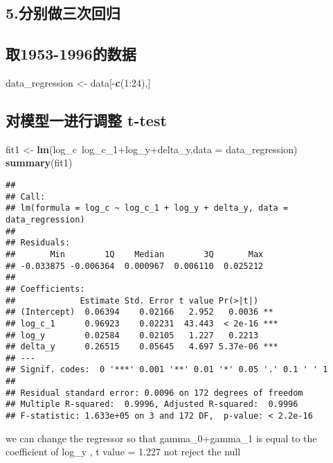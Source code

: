 \documentclass[]{article}
\newenvironment{Shaded}{\begin{snugshade}}{\end{snugshade}}
\newcommand{\KeywordTok}[1]{\textcolor[rgb]{0.13,0.29,0.53}{\textbf{{#1}}}}
\newcommand{\DataTypeTok}[1]{\textcolor[rgb]{0.13,0.29,0.53}{{#1}}}
\newcommand{\DecValTok}[1]{\textcolor[rgb]{0.00,0.00,0.81}{{#1}}}
\newcommand{\StringTok}[1]{\textcolor[rgb]{0.31,0.60,0.02}{{#1}}}
\newcommand{\NormalTok}[1]{{#1}}
\begin{document}
\subsection{5.分别做三次回归}

\subsection{取1953-1996的数据}\label{1953-1996}

\begin{Shaded}
\begin{Highlighting}[]
\NormalTok{data_regression <-}\StringTok{ }\NormalTok{data[-}\KeywordTok{c}\NormalTok{(}\DecValTok{1}\NormalTok{:}\DecValTok{24}\NormalTok{),]}
\end{Highlighting}
\end{Shaded}

\subsection{对模型一进行调整 t-test}\label{-t-test}

\begin{Shaded}
\begin{Highlighting}[]
\NormalTok{fit1 <-}\StringTok{ }\KeywordTok{lm}\NormalTok{(log_c~log_c_1+log_y+delta_y,}\DataTypeTok{data =} \NormalTok{data_regression)}
\KeywordTok{summary}\NormalTok{(fit1)}
\end{Highlighting}
\end{Shaded}

\begin{verbatim}
## 
## Call:
## lm(formula = log_c ~ log_c_1 + log_y + delta_y, data = data_regression)
## 
## Residuals:
##       Min        1Q    Median        3Q       Max 
## -0.033875 -0.006364  0.000967  0.006110  0.025212 
## 
## Coefficients:
##             Estimate Std. Error t value Pr(>|t|)    
## (Intercept)  0.06394    0.02166   2.952   0.0036 ** 
## log_c_1      0.96923    0.02231  43.443  < 2e-16 ***
## log_y        0.02584    0.02105   1.227   0.2213    
## delta_y      0.26515    0.05645   4.697 5.37e-06 ***
## ---
## Signif. codes:  0 '***' 0.001 '**' 0.01 '*' 0.05 '.' 0.1 ' ' 1
## 
## Residual standard error: 0.0096 on 172 degrees of freedom
## Multiple R-squared:  0.9996, Adjusted R-squared:  0.9996 
## F-statistic: 1.633e+05 on 3 and 172 DF,  p-value: < 2.2e-16
\end{verbatim}

we can change the regressor so that gamma\_0+gamma\_1 is equal to the
coefficient of log\_y , t value = 1.227 not reject the null
\end{document}

